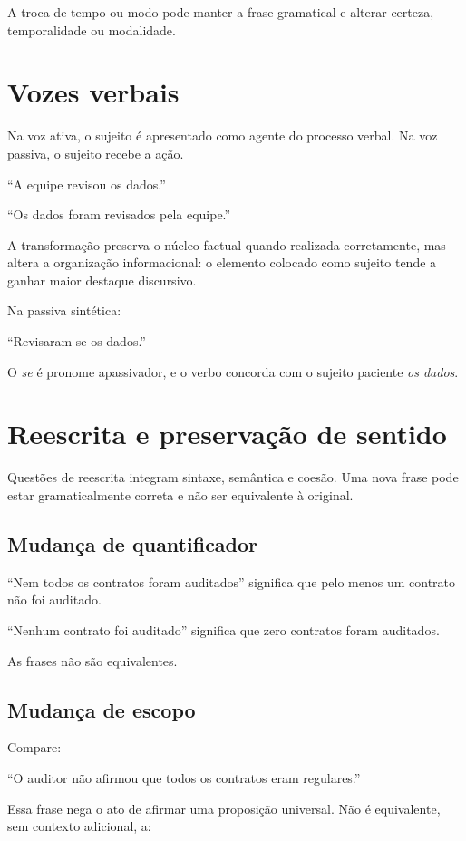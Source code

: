 A troca de tempo ou modo pode manter a frase gramatical e alterar certeza, temporalidade ou modalidade.

\section{Vozes verbais}

Na voz ativa, o sujeito é apresentado como agente do processo verbal. Na voz passiva, o sujeito recebe a ação.

``A equipe revisou os dados.''

``Os dados foram revisados pela equipe.''

A transformação preserva o núcleo factual quando realizada corretamente, mas altera a organização informacional: o elemento colocado como sujeito tende a ganhar maior destaque discursivo.

Na passiva sintética:

``Revisaram-se os dados.''

O \emph{se} é pronome apassivador, e o verbo concorda com o sujeito paciente \emph{os dados}.

\section{Reescrita e preservação de sentido}

Questões de reescrita integram sintaxe, semântica e coesão. Uma nova frase pode estar gramaticalmente correta e não ser equivalente à original.

\subsection{Mudança de quantificador}

``Nem todos os contratos foram auditados'' significa que pelo menos um contrato não foi auditado.

``Nenhum contrato foi auditado'' significa que zero contratos foram auditados.

As frases não são equivalentes.

\subsection{Mudança de escopo}

Compare:

``O auditor não afirmou que todos os contratos eram regulares.''

Essa frase nega o ato de afirmar uma proposição universal. Não é equivalente, sem contexto adicional, a:

